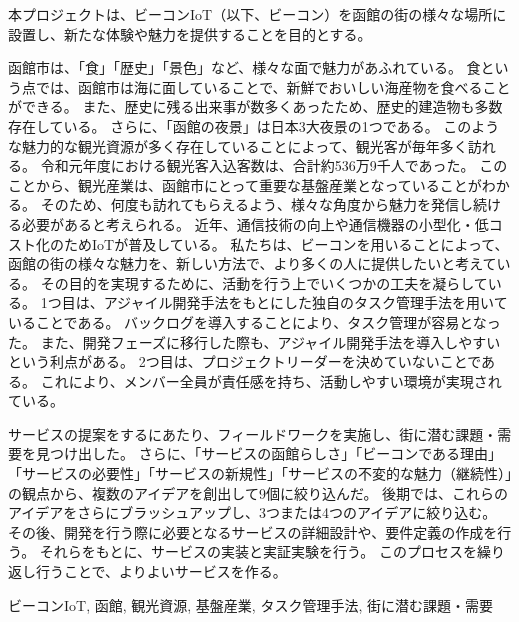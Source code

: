 \begin{jabstract} 
本プロジェクトは、ビーコンIoT（以下、ビーコン）を函館の街の様々な場所に設置し、新たな体験や魅力を提供することを目的とする。

函館市は、「食」「歴史」「景色」など、様々な面で魅力があふれている。
食という点では、函館市は海に面していることで、新鮮でおいしい海産物を食べることができる。
また、歴史に残る出来事が数多くあったため、歴史的建造物も多数存在している。
さらに、「函館の夜景」は日本3大夜景の1つである。
このような魅力的な観光資源が多く存在していることによって、観光客が毎年多く訪れる。
令和元年度における観光客入込客数は、合計約536万9千人であった。
このことから、観光産業は、函館市にとって重要な基盤産業となっていることがわかる。
そのため、何度も訪れてもらえるよう、様々な角度から魅力を発信し続ける必要があると考えられる。
近年、通信技術の向上や通信機器の小型化・低コスト化のためIoTが普及している。
私たちは、ビーコンを用いることによって、函館の街の様々な魅力を、新しい方法で、より多くの人に提供したいと考えている。
その目的を実現するために、活動を行う上でいくつかの工夫を凝らしている。
1つ目は、アジャイル開発手法をもとにした独自のタスク管理手法を用いていることである。
バックログを導入することにより、タスク管理が容易となった。
また、開発フェーズに移行した際も、アジャイル開発手法を導入しやすいという利点がある。
2つ目は、プロジェクトリーダーを決めていないことである。
これにより、メンバー全員が責任感を持ち、活動しやすい環境が実現されている。

サービスの提案をするにあたり、フィールドワークを実施し、街に潜む課題・需要を見つけ出した。
さらに、「サービスの函館らしさ」「ビーコンである理由」「サービスの必要性」「サービスの新規性」「サービスの不変的な魅力（継続性）」の観点から、複数のアイデアを創出して9個に絞り込んだ。
後期では、これらのアイデアをさらにブラッシュアップし、3つまたは4つのアイデアに絞り込む。
その後、開発を行う際に必要となるサービスの詳細設計や、要件定義の作成を行う。
それらをもとに、サービスの実装と実証実験を行う。
このプロセスを繰り返し行うことで、よりよいサービスを作る。

\begin{jkeyword}
ビーコンIoT, 函館, 観光資源, 基盤産業, タスク管理手法, 街に潜む課題・需要
\end{jkeyword}
\end{jabstract}

